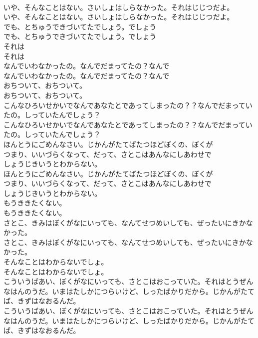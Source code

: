 \documentclass[8pt]{extreport}
\begin{document}
\begin{CJK}{UTF8}{min}
\\	いや、そんなことはない。さいしょはしらなかった。それはじじつだよ。
\\	いや、そんなことはない。さいしょはしらなかった。それはじじつだよ。
\\	でも、とちゅうできづいてたでしょう。でしょう
\\	でも、とちゅうできづいてたでしょう。でしょう
\\	それは
\\	それは
\\	なんでいわなかったの。なんでだまってたの？なんで
\\	なんでいわなかったの。なんでだまってたの？なんで
\\	おちついて、おちついて。
\\	おちついて、おちついて。
\\	こんなひろいせかいでなんであなたとであってしまったの？？なんでだまっていたの。しっていたんでしょう？
\\	こんなひろいせかいでなんであなたとであってしまったの？？なんでだまっていたの。しっていたんでしょう？
\\	ほんとうにごめんなさい。じかんがたてばたつほどぼくの、ぼくが
\\	つまり、いいづらくなって、だって、さとこはあんなにしあわせで
\\	しょうじきいうとわからない。
\\	ほんとうにごめんなさい。じかんがたてばたつほどぼくの、ぼくが
\\	つまり、いいづらくなって、だって、さとこはあんなにしあわせで
\\	しょうじきいうとわからない。
\\	もうききたくない。
\\	もうききたくない。
\\	さとこ、きみはぼくがなにいっても、なんてせつめいしても、ぜったいにきかなかった。
\\	さとこ、きみはぼくがなにいっても、なんてせつめいしても、ぜったいにきかなかった。
\\	そんなことはわからないでしょ。
\\	そんなことはわからないでしょ。
\\	こういうばあい、ぼくがなにいっても、さとこはおこっていた。それはとうぜんなはんのうだ。いまはたしかにつらいけど、しったばかりだから。じかんがたてば、きずはなおるんだ。
\\	こういうばあい、ぼくがなにいっても、さとこはおこっていた。それはとうぜんなはんのうだ。いまはたしかにつらいけど、しったばかりだから。じかんがたてば、きずはなおるんだ。

\end{CJK}
\end{document}
